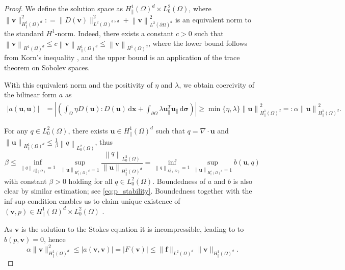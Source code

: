 \documentclass[final,leqno]{scrarticle}
\newcommand{\norm}[1]{\left\| #1 \right\|}
\newcommand{\lzo}{L^2(\Omega)}
\newcommand{\Htd}{{H^1_\|(\Omega)^d}}
\newcommand{\Hd}{{H^1(\Omega)^d}}
\newcommand{\lzd}{{L^2(\Omega)^d}}
\newcommand{\dd}{\, \mathrm{d}}
\begin{document}
\begin{proof}

We define the solution space as $H^1_{\parallel}(\Omega)^d\times  L_0^2(\Omega)$, where $\| \mathbf{v} \|_{\Htd}^2: = \| D(\mathbf{v}) \|_{{\lzo}^{d\times d}}^2 + \norm{\mathbf{v}}^2_{L^2(\partial\Omega)^d}$ is an equivalent norm to the standard $H^1$-norm. Indeed, there exists a constant $c>0$ such that $\norm{\mathbf{v}}_{\Hd}\leq c \norm{\mathbf{v}}_{\Htd}\leq \norm{\mathbf{v}}_{\Hd}$, where the lower bound follows from Korn's inequality  \cite[Lemma A.2(c)]{Lechleiter13}, and the upper bound is an application of the trace theorem on Sobolev spaces.

With this equivalent norm and the positivity of $\eta$ and $\lambda$, we obtain coercivity of the bilinear form $a$ as 
\begin{equation}
\begin{split}
\label{eq:coercivity}
  \left\lvert a(\mathbf{u},\mathbf{u}) \right\rvert 
  &= \left\lvert  \left( \int_{\Omega} \eta D (\mathbf{u}) : D (\mathbf{u}) \dd \mathbf{x} +  \int_{\partial \Omega}\lambda \mathbf{u}_\parallel^T \mathbf{u}_\parallel \dd \boldsymbol{\sigma}   \right)  \right\rvert 
    \geq \min\lbrace\eta,\lambda\rbrace \left\lVert \mathbf{u} \right\rVert_{H^1_{\parallel}(\Omega)^d}^2=:\alpha \left\lVert \mathbf{u} \right\rVert_{H^1_{\parallel}(\Omega)^d}^2.
\end{split}
\end{equation}

For any $q\in L_0^2(\Omega)$, there exists $\mathbf{u}\in \Htd$ such that  $q = \nabla \cdot \mathbf{u}$ and $\left\lVert \mathbf{u} \right\rVert_{H_\parallel^1(\Omega)^d} \leq \frac{1}{\beta} \left\lVert q \right\rVert_{L_0^2(\Omega)}$, thus
\begin{equation}
\label{eq:inf_sup}
\beta \leq \inf_{\norm{q}_{L_0^2(\Omega)}=1} \ \sup_{\norm{\mathbf{u}}_{\Htd} = 1} \frac{\norm{q}_{L_0^2(\Omega)}}{\norm{\mathbf{u}}_{\Htd}}
   = \inf_{\norm{q}_{L_0^2(\Omega)}=1} \sup_{\norm{\mathbf{u}}_{\Htd} = 1}b(\mathbf{u},q)
   \end{equation}
with constant $\beta > 0$ holding for all $q\in L_0^2(\Omega)$. Boundedness of $a$ and $b$ is also clear by similar estimation; see  \eqref{eq:p_stability}.
Boundedness together with the inf-sup condition enables us to claim unique existence of $(\mathbf{v},p)\in H^1_{\parallel}(\Omega)^d\times  L_0^2(\Omega)$ .

As $\mathbf{v}$ is the solution to the Stokes equation it is incompressible, leading to to $b(p,\mathbf{v}) = 0$, hence
\begin{equation}
	\label{eq:v_stability}
    \alpha \| \mathbf{v} \|^2_\Htd  \leq | a(\mathbf{v},\mathbf{v}) |= | F(\mathbf{v}) | \leq \| \mathbf{f} \|_\lzd \| \mathbf{v} \|_\Htd.
\end{equation}


\end{proof}
\end{document}
